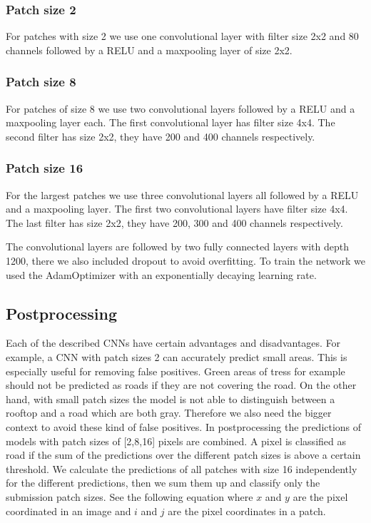 \documentclass[10pt,conference,compsocconf]{IEEEtran}
\begin{document}
\subsubsection{Patch size 2}
	For patches with size 2 we use one convolutional layer with filter size 2x2 and 80 channels followed by a RELU and a maxpooling layer of size 2x2. 
\subsubsection{Patch size 8}
	For patches of size 8 we use two convolutional layers followed by a RELU and a maxpooling layer each. The first convolutional layer has filter size 4x4. The second filter has size 2x2, they have 200 and 400 channels respectively. 
\subsubsection{Patch size 16}
    For the largest patches we use three convolutional layers all followed by a RELU and a maxpooling layer. The first two convolutional layers have filter size 4x4. The last filter has size 2x2, they have 200, 300 and 400 channels respectively. 
    
The convolutional layers are followed by two fully connected layers with depth 1200, there we also included dropout to avoid overfitting. To train the network we used the AdamOptimizer \cite{adam} with an exponentially decaying learning rate.

    
\subsection{Postprocessing}
Each of the described CNNs have certain advantages and disadvantages. For example, a CNN with patch sizes 2 can accurately predict small areas. This is especially useful for removing false positives. Green areas of tress for example should not be predicted as roads if they are not covering the road. On the other hand, with small patch sizes the model is not able to distinguish between a rooftop and a road which are both gray. Therefore we also need the bigger context to avoid these kind of false positives. In postprocessing the predictions of models with patch sizes of [2,8,16] pixels are combined. A pixel is classified as road if the sum of the predictions over the different patch sizes is above a certain threshold.
We calculate the predictions of all patches with size 16 independently for the different predictions, then we sum them up and classify only the submission patch sizes. See the following equation where $x$ and $y$ are the pixel coordinated in an image and $i$ and $j$ are the pixel coordinates in a patch.
\end{document}
